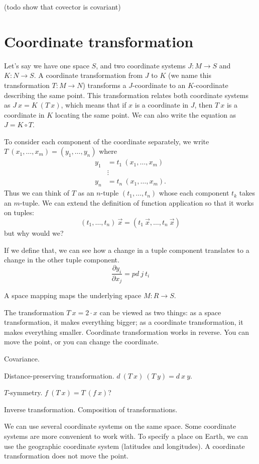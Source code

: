 (todo show that covector is covariant)

\section{Coordinate transformation}

Let's say we have one space $S$,
and two coordinate systems $J : M \to S$ and $K : N \to S$.
A coordinate transformation from $J$ to $K$ (we name this transformation $T : M \to N$)
transforms a $J$-coordinate
to an $K$-coordinate describing the same point.
This transformation relates both coordinate systems as
$J~x = K~(T~x)$, which means that if $x$ is a coordinate in $J$, then $T~x$ is a coordinate in $K$ locating the same point.
We can also write the equation as $J = K \circ T$.

To consider each component of the coordinate separately,
we write
$T~(x_1,\ldots,x_m) = (y_1,\ldots,y_n)$
where
\begin{align*}
y_1 &= t_1~(x_1,\ldots,x_m)
\\ &\vdots
\\ y_n &= t_n~(x_1,\ldots,x_m).
\end{align*}
Thus we can think of $T$ as an $n$-tuple $(t_1,\ldots,t_n)$
whose each component $t_k$ takes an $m$-tuple.
We can extend the definition of function application so that it works on tuples:
\[
(t_1,\ldots,t_n)~\vec{x} = (t_1~\vec{x}, \ldots, t_n~\vec{x})
\]
but why would we?

If we define that, we can see how a change in a tuple component translates
to a change in the other tuple component.
\[
\frac{\partial y_i}{\partial x_j} = pd~j~t_i
\]

A space mapping maps the underlying space $M : R \to S$.

The transformation $T~x = 2\cdot x$ can be viewed as two things:
as a space transformation, it makes everything bigger;
as a coordinate transformation, it makes everything smaller.
Coordinate transformation works in reverse.
You can move the point, or you can change the coordinate.

Covariance.

Distance-preserving transformation.
$d~(T~x)~(T~y) = d~x~y$.

$T$-symmetry.
$f~(T~x) = T~(f~x)$?

Inverse transformation.
Composition of transformations.

We can use several coordinate systems on the same space.
Some coordinate systems are more convenient to work with.
To specify a place on Earth, we can use the
geographic coordinate system (latitudes and longitudes).
A coordinate transformation does not move the point.

